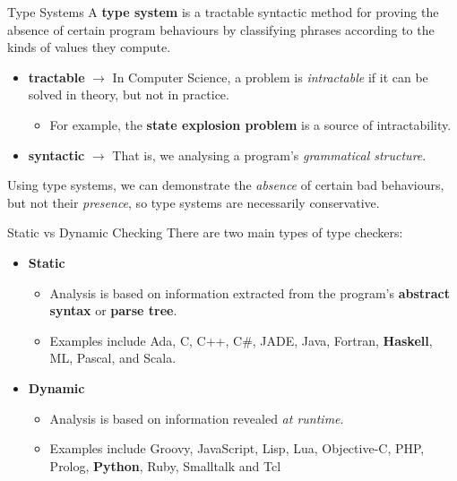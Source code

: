 \documentclass[11pt]{beamer}
\begin{document}
\begin{frame}[fragile=singleslide]{Type Systems}
A \textbf{type system} is a tractable syntactic method for proving the absence of certain program behaviours by classifying phrases according to the kinds of values they compute.  
\begin{itemize}
\item \textbf{tractable} $\rightarrow$ In Computer Science, a problem is \emph{intractable} if it can be solved in theory, but not in practice.  
\begin{itemize}
\item For example, the \textbf{state explosion problem} is a source of intractability. 
\end{itemize}
\item \textbf{syntactic} $\rightarrow$ That is, we analysing a program's \emph{grammatical structure}.
\end{itemize}
Using type systems, we can demonstrate the \emph{absence} of certain bad behaviours, but not their \emph{presence}, so type systems are necessarily conservative.  
\end{frame}         

\begin{frame}[fragile=singleslide]{Static vs Dynamic Checking}
There are two main types of type checkers:
\begin{itemize}
\item \textbf{Static}
\begin{itemize}
\item Analysis is based on information extracted from the program's \textbf{abstract syntax} or \textbf{parse tree}.
\item Examples include Ada, C, C++, C\#, JADE, Java, Fortran, \textbf{Haskell}, ML, Pascal, and Scala. 
\end{itemize}
\item \textbf{Dynamic}
\begin{itemize}
\item Analysis is based on information revealed \emph{at runtime}.
\item Examples include Groovy, JavaScript, Lisp, Lua, Objective-C, PHP, Prolog, \textbf{Python}, Ruby, Smalltalk and Tcl
\end{itemize}
\end{itemize}
\end{frame}
\end{document}
